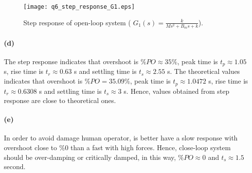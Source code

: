 \begin{figure}[h!]
	\centering
	\texttt{[image: q6\_step\_response\_G1.eps]}
	\caption{Step response of open-loop system ( $G_1(s)=\frac{k}{M s^2 + B_m s + k}$).}
	\label{fig:q6_step_response_G1}
\end{figure}

\paragraph{(d)} The step response indicates that overshoot is $\%PO \approx 35\%$, peak time is $t_p \approx 1.05$ s, rise time is $t_r \approx 0.63$ s and settling time is $t_s \approx 2.55$ s. The theoretical values indicates that overshoot is $\%PO = 35.09\%$, peak time is $t_p \approx 1.0472$ s, rise time is $t_r \approx 0.6308$ s and settling time is $t_s \approx 3$ s. Hence, values obtained from step response are close to theoretical ones.

\paragraph{(e)} In order to avoid damage human operator, is better have a slow response with overshoot close to $\% 0$ than a fast with high forces. Hence, close-loop system should be over-damping or critically damped, in this way, $\%PO \approx 0$ and  $t_s \approx 1.5$ second. 
